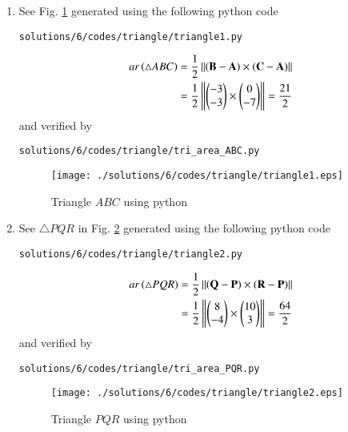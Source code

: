 \begin{enumerate}
\item  See Fig. \ref{fig:1.2.6_triangle_1} generated using the following python code
\begin{lstlisting}
solutions/6/codes/triangle/triangle1.py
\end{lstlisting}
\begin{align}
ar\left(\triangle ABC\right) &= \frac{1}{2}\left\lVert(\mathbf{B}-\mathbf{A})\times(\mathbf{C}-\mathbf{A})\right\rVert
\\
&=\frac{1}{2}\left\lVert\begin{pmatrix}-3\\-3\end{pmatrix} \times \begin{pmatrix}0\\-7\end{pmatrix}\right\rVert = \frac{21}{2}
\end{align}
and verified by
\begin{lstlisting}
solutions/6/codes/triangle/tri_area_ABC.py
\end{lstlisting} 
%
\begin{figure}[!ht]
\centering
\texttt{[image: ./solutions/6/codes/triangle/triangle1.eps]}
\caption{Triangle $ABC$ using python}
\label{fig:1.2.6_triangle_1}
\end{figure} 

\item See $\triangle{PQR}$ in Fig. \ref{fig:1.2.6_triangle_2}   generated using the following python code
\begin{lstlisting}
solutions/6/codes/triangle/triangle2.py
\end{lstlisting}
%
\begin{align}
ar\left(\triangle PQR\right) &=\frac{1}{2}\left\lVert(\mathbf{Q}-\mathbf{P})\times(\mathbf{R}-\mathbf{P})\right\rVert
\\
&=\frac{1}{2}\left\lVert\begin{pmatrix}8\\-4\end{pmatrix} \times \begin{pmatrix}10\\3\end{pmatrix}\right\rVert = \frac{64}{2}
\end{align}
and verified by 
\begin{lstlisting}
solutions/6/codes/triangle/tri_area_PQR.py
\end{lstlisting} 
%
\begin{figure}[!ht]
\centering
\texttt{[image: ./solutions/6/codes/triangle/triangle2.eps]}
\caption{Triangle $PQR$ using python}
\label{fig:1.2.6_triangle_2}
\end{figure} 
\end{enumerate}
